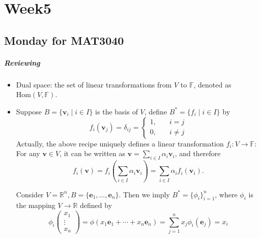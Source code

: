 \chapter{Week5}
\section{Monday for MAT3040}
\paragraph{Reviewing}
\begin{itemize}
\item
Dual space: the set of linear transformations from $V$ to $\mathbb{F}$, denoted as $\text{Hom}(V,\mathbb{F})$.
\item
Suppose $B=\{\bm v_i\mid i\in I\}$ is the basis of $V$, define $B^*=\{f_i\mid i\in I\}$ by
\[
f_i(\bm v_j) = \delta_{ij}=\left\{
\begin{aligned}
1,&\quad i=j\\
0,&\quad i\ne j
\end{aligned}
\right.
\]
Actually, the above recipe uniquely defines a linear transformation $f_i:V\to\mathbb{F}$: For any $\bm v\in V$, it can be written as $\bm v = \sum_{i\in I}\alpha_i\bm v_i$, and therefore
\[
f_i(\bm v)=f_i(\sum_{i\in I}\alpha_i\bm v_i)= \sum_{i\in I}\alpha_if_i(\bm v_i).
\]

\begin{example}
Consider $V=\mathbb{R}^n, B=\{\bm e_1,\dots,\bm e_n\}$. Then we imply $B^*=\{\phi_i\}_{i=1}^n$, where $\phi_i$ is the mapping $V\to\mathbb{R}$ defined by
\[
\phi_i\begin{pmatrix}
x_1\\\vdots\\ x_n
\end{pmatrix}=\phi(x_1\bm e_1+\cdots+x_n\bm e_n)=\sum_{j=1}^nx_j\phi_i(\bm e_j) = x_i
\]
\end{example}
\end{itemize}


